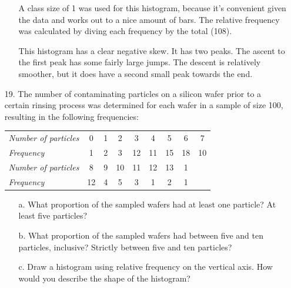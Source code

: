\documentclass[letterpaper,12pt]{article}
\begin{document}
\begin{enumerate}
\begin{enumerate}
\begin{center}
        \end{center}
        A class size of 1 was used for this histogram, because it's convenient given the data and works out to a nice amount of bars. The relative frequency was calculated by diving each frequency by the total (108).

        This histogram has a clear negative skew. It has two peaks. The ascent to the first peak has some fairly large jumps. The descent is relatively smoother, but it does have a second small peak towards the end.
    \end{enumerate}
  \item[19.]
    The number of contaminating particles on a silicon wafer prior to a certain rinsing process was determined for each wafer in a sample of size 100, resulting in the following frequencies:
    \begin{center}
      \begin{tabular}{
        >{\itshape}l
        S[table-format=2.0]
        S[table-format=2.0]
        S[table-format=2.0]
        S[table-format=2.0]
        S[table-format=2.0]
        S[table-format=2.0]
        S[table-format=2.0]
        S[table-format=2.0]
      }
        Number of particles & 0 & 1 & 2 & 3 & 4 & 5 & 6 & 7 \\
        Frequency & 1 & 2 & 3 & 12 & 11 & 15 & 18 & 10 \\
        Number of particles & 8 & 9 & 10 & 11 & 12 & 13 & 1 \\
        Frequency & 12 & 4 & 5 & 3 & 1 & 2 & 1
      \end{tabular}
    \end{center}
    \begin{enumerate}
      \item[a.]
        What proportion of the sampled wafers had at least one particle? At least five particles?
      \item[b.]
        What proportion of the sampled wafers had between five and ten particles, inclusive? Strictly between five and ten particles?
      \item[c.]
        Draw a histogram using relative frequency on the vertical axis. How would you describe the shape of the histogram?

\end{enumerate}
\end{enumerate}
\end{document}
